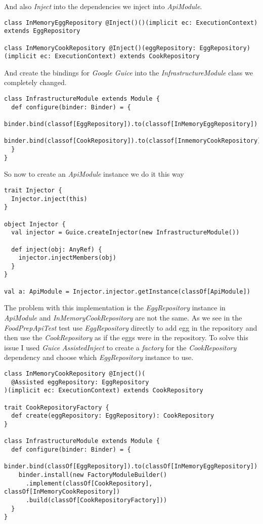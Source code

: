 \documentclass[a4paper,11pt]{article}
\begin{document}
And also \emph{Inject} into the dependencies we inject into \emph{ApiModule}.

\begin{lstlisting}[style=scala]
class InMemoryEggRepository @Inject()()(implicit ec: ExecutionContext) extends EggRepository

class InMemoryCookRepository @Inject()(eggRepository: EggRepository)(implicit ec: ExecutionContext) extends CookRepository
\end{lstlisting}

And create the bindings for \emph{Google Guice} into the \emph{InfrastructureModule}
class we completely changed.

\begin{lstlisting}[style=scala]
class InfrastructureModule extends Module {
  def configure(binder: Binder) = {
    binder.bind(classof[EggRepository]).to(classof[InMemoryEggRepository])
    binder.bind(classof[CookRepository]).to(classof[InmemoryCookRepository])
  }
}
\end{lstlisting}

So now to create an \emph{ApiModule} instance we do it this way

\begin{lstlisting}[style=scala]
trait Injector {
  Injector.inject(this)
}

object Injector {
  val injector = Guice.createInjector(new InfrastructureModule())

  def inject(obj: AnyRef) {
    injector.injectMembers(obj)
  }
}

val a: ApiModule = Injector.injector.getInstance(classOf[ApiModule])
\end{lstlisting}

The problem with this implementation is the \emph{EggRepository} instance
in \emph{ApiModule} and \emph{InMemoryCookRepository} are not the same. As we
see in the \emph{FoodPrepApiTest} test use \emph{EggRepository} directly to add
egg in the repository and then use the \emph{CookRepository} as if the eggs were
in the repository. To solve this issue I used \emph{Guice} \emph{AssistedInject}
to create a \emph{factory} for the \emph{CookRepository} dependency and choose
which \emph{EggRepository} instance to use.

\begin{lstlisting}[style=scala]
class InMemoryCookRepository @Inject()(
  @Assisted eggRepository: EggRepository
)(implicit ec: ExecutionContext) extends CookRepository

trait CookRepositoryFactory {
  def create(eggRepository: EggRepository): CookRepository
}

class InfrastructureModule extends Module {
  def configure(binder: Binder) = {
    binder.bind(classOf[EggRepository]).to(classOf[InMemoryEggRepository])
    binder.install(new FactoryModuleBuilder()
      .implement(classOf[CookRepository], classOf[InMemoryCookRepository])
      .build(classOf[CookRepositoryFactory]))
  }
}
\end{lstlisting}
\end{document}
